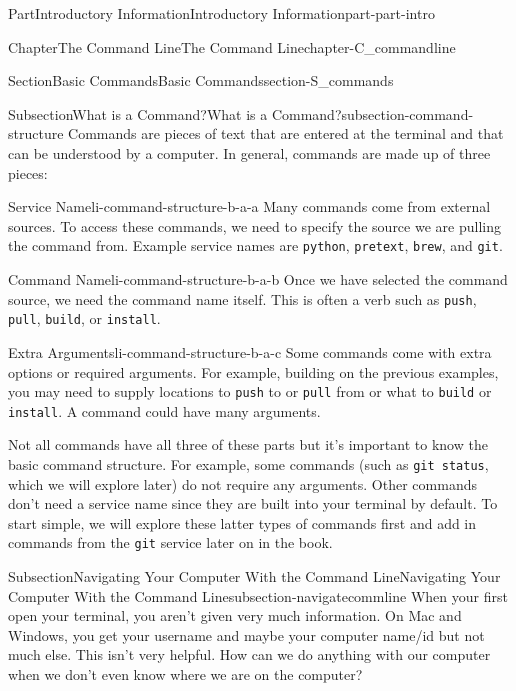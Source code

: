 \documentclass[oneside,10pt,]{book}
\newcommand{\mono}[1]{\texttt{#1}}
\begin{document}
\begin{partptx}{Part}{Introductory Information}{}{Introductory Information}{}{}{part-part-intro}
\begin{chapterptx}{Chapter}{The Command Line}{}{The Command Line}{}{}{chapter-C_commandline}
\begin{sectionptx}{Section}{Basic Commands}{}{Basic Commands}{}{}{section-S_commands}
\begin{subsectionptx}{Subsection}{What is a Command?}{}{What is a Command?}{}{}{subsection-command-structure}
Commands are pieces of text that are entered at the terminal and that can be understood by a computer. In general, commands are made up of three pieces:%
\begin{descriptionlist}
\begin{dlimedium}{Service Name}{li-command-structure-b-a-a}%
Many commands come from external sources. To access these commands, we need to specify the source we are pulling the command from. Example service names are \mono{python}, \mono{pretext}, \mono{brew}, and \mono{git}.%
\end{dlimedium}%
\begin{dlimedium}{Command Name}{li-command-structure-b-a-b}%
Once we have selected the command source, we need the command name itself. This is often a verb such as \mono{push}, \mono{pull}, \mono{build}, or \mono{install}.%
\end{dlimedium}%
\begin{dlimedium}{Extra Arguments}{li-command-structure-b-a-c}%
Some commands come with extra options or required arguments. For example, building on the previous examples, you may need to supply locations to \mono{push} to or \mono{pull} from or what to \mono{build} or \mono{install}. A command could have many arguments.%
\end{dlimedium}%
\end{descriptionlist}
%
\par
Not all commands have all three of these parts but it's important to know the basic command structure. For example, some commands (such as \mono{git status}, which we will explore later) do not require any arguments. Other commands don't need a service name since they are built into your terminal by default. To start simple, we will explore these latter types of commands first and add in commands from the \mono{git} service later on in the book.%
\end{subsectionptx}
%
%
\typeout{************************************************}
\typeout{************************************************}
%
\begin{subsectionptx}{Subsection}{Navigating Your Computer With the Command Line}{}{Navigating Your Computer With the Command Line}{}{}{subsection-navigatecommline}
%
When your first open your terminal, you aren't given very much information. On Mac and Windows, you get your username and maybe your computer name\slash{}id but not much else. This isn't very helpful. How can we do anything with our computer when we don't even know where we are on the computer?%

\end{subsectionptx}
\end{sectionptx}
\end{chapterptx}
\end{partptx}
\end{document}
